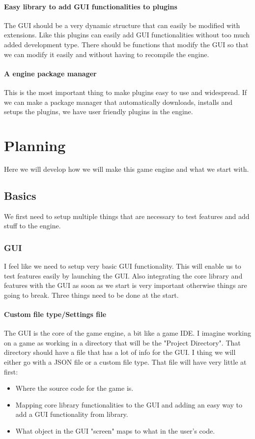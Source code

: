 \documentclass{article}
\begin{document}
	\paragraph{Easy library to add GUI functionalities to plugins}
	The GUI should be a very dynamic structure that can easily be modified with extensions. Like this plugins can easily add GUI functionalities without too much added development type. There should be functions that modify the GUI so that we can modify it easily and without having to recompile the engine.
	\paragraph{A engine package manager}
	This is the most important thing to make plugins easy to use and widespread. If we can make a package manager that automatically downloads, installs and setups the plugins, we have user friendly plugins in the engine.
	\section{Planning}
	Here we will develop how we will make this game engine and what we start with.
	\subsection{Basics}
	We first need to setup multiple things that are necessary to test features and
	add stuff to the engine.
	\subsubsection{GUI}
	I feel like we need to setup very basic GUI functionality. This will enable us to test features easily by launching the GUI. Also integrating the core library and features with the GUI as soon as we start is very important otherwise things are going to break. Three things need to be done at the start.
	\paragraph{Custom file type/Settings file}
	The GUI is the core of the game engine, a bit like a game IDE. I imagine working on a game as working in a directory that will be the "Project Directory". That directory should have a file that has a lot of info for the GUI. I thing we will either go with a JSON file or a custom file type. That file will have very little at first:
	\begin{itemize}
		\item Where the source code for the game is.
		\item Mapping core library functionalities to the GUI and adding an easy way to add a GUI functionality from library.
		\item What object in the GUI "screen" maps to what in the user's code.
	\end{itemize}
\end{document}
